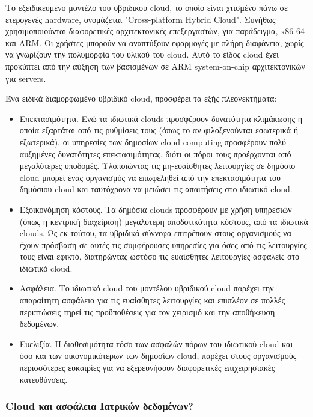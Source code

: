		Το εξειδικευμένο μοντέλο του υβριδικού cloud, το οποίο είναι χτισμένο πάνω σε ετερογενές hardware, ονομάζεται "Cross-platform Hybrid Cloud". Συνήθως χρησιμοποιούνται διαφορετικές αρχιτεκτονικές επεξεργαστών, για παράδειγμα, x86-64 και ARM. Οι χρήστες μπορούν να αναπτύξουν εφαρμογές με πλήρη διαφάνεια, χωρίς να γνωρίζουν την πολυμορφία του υλικού του cloud. Αυτό το είδος cloud έχει προκύπτει από την αύξηση των βασισμένων σε ARM system-on-chip αρχιτεκτονικών για servers.
		
		Ένα ειδικά διαμορφωμένο υβριδικό cloud, προσφέρει τα εξής πλεονεκτήματα:
		
		\begin{itemize}

		\item Επεκτασιμότητα. Ενώ τα ιδιωτικά clouds προσφέρουν δυνατότητα κλιμάκωσης η οποία εξαρτάται από τις ρυθμίσεις τους (όπως το αν φιλοξενούνται εσωτερικά ή εξωτερικά), οι υπηρεσίες των δημοσίων cloud computing προσφέρουν πολύ αυξημένες δυνατότητες επεκτασιμότητας, διότι οι πόροι τους προέρχονται από μεγαλύτερες υποδομές. Υλοποιώντας τις μη-ευαίσθητες λειτουργίες σε δημόσιο cloud μπορεί ένας οργανισμός να επωφεληθεί από την επεκτασιμότητα του δημόσιου cloud και ταυτόχρονα να μειώσει τις απαιτήσεις στο ιδιωτικό cloud.
		
		\item Εξοικονόμηση κόστους. Τα δημόσια clouds  προσφέρουν με χρήση υπηρεσιών (όπως η κεντρική διαχείριση) μεγαλύτερη αποδοτικότητα κόστους, από  τα ιδιωτικά clouds. Ως εκ τούτου, τα υβριδικά σύννεφα επιτρέπουν στους οργανισμούς να έχουν πρόσβαση σε αυτές τις συμφέρουσες υπηρεσίες για όσες από τις λειτουργίες τους είναι εφικτό, διατηρώντας ωστόσο τις ευαίσθητες λειτουργίες ασφαλείς στο ιδιωτικό cloud.

		\item Ασφάλεια. Το ιδιωτικό cloud του μοντέλου υβριδικού cloud παρέχει την απαραίτητη ασφάλεια για τις ευαίσθητες λειτουργίες και επιπλέον σε πολλές περιπτώσεις τηρεί τις προϋποθέσεις για τον χειρισμό και την αποθήκευση δεδομένων.

		\item Ευελιξία. Η διαθεσιμότητα τόσο των ασφαλών πόρων του ιδιωτικού cloud και όσο και των οικονομικότερων των δημοσίων cloud, παρέχει στους οργανισμούς περισσότερες ευκαιρίες για να εξερευνήσουν διαφορετικές επιχειρησιακές κατευθύνσεις.
		\end{itemize} 
		
			\subsubsection{Cloud και ασφάλεια Ιατρικών δεδομένων?}
				
